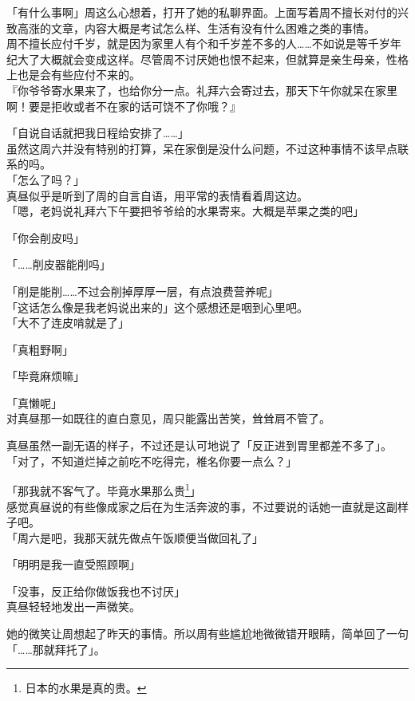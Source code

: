 「有什么事啊」周这么心想着，打开了她的私聊界面。上面写着周不擅长对付的兴致高涨的文章，内容大概是考试怎么样、生活有没有什么困难之类的事情。\\

周不擅长应付千岁，就是因为家里人有个和千岁差不多的人……不如说是等千岁年纪大了大概就会变成这样。尽管周不讨厌她也恨不起来，但就算是亲生母亲，性格上也是会有些应付不来的。\\%

『你爷爷寄水果来了，也给你分一点。礼拜六会寄过去，那天下午你就呆在家里啊！要是拒收或者不在家的话可饶不了你哦？』

「自说自话就把我日程给安排了……」\\

虽然这周六并没有特别的打算，呆在家倒是没什么问题，不过这种事情不该早点联系的吗。\\

「怎么了吗？」\\

真昼似乎是听到了周的自言自语，用平常的表情看着周这边。\\

「嗯，老妈说礼拜六下午要把爷爷给的水果寄来。大概是苹果之类的吧」

「你会削皮吗」

「……削皮器能削吗」

「削是能削……不过会削掉厚厚一层，有点浪费营养呢」\\

「这话怎么像是我老妈说出来的」这个感想还是咽到心里吧。\\

「大不了连皮啃就是了」

「真粗野啊」

「毕竟麻烦嘛」

「真懒呢」\\%

对真昼那一如既往的直白意见，周只能露出苦笑，耸耸肩不管了。

真昼虽然一副无语的样子，不过还是认可地说了「反正进到胃里都差不多了」。\\

「对了，不知道烂掉之前吃不吃得完，椎名你要一点么？」

「那我就不客气了。毕竟水果那么贵\footnote{日本的水果是真的贵。}」\\

感觉真昼说的有些像成家之后在为生活奔波的事，不过要说的话她一直就是这副样子吧。\\%

「周六是吧，我那天就先做点午饭顺便当做回礼了」

「明明是我一直受照顾啊」

「没事，反正给你做饭我也不讨厌」\\

真昼轻轻地发出一声微笑。

她的微笑让周想起了昨天的事情。所以周有些尴尬地微微错开眼睛，简单回了一句「……那就拜托了」。
